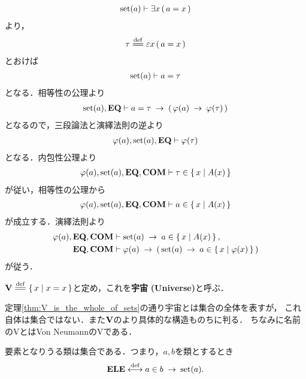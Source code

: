 	\begin{sketch}
		\begin{align}
			\operatorname*{set} (a) \vdash \exists x\, (\, a = x\, )
		\end{align}
		より，
		\begin{align}
			\tau \defeq \varepsilon x\, (\, a = x\, )
		\end{align}
		とおけば
		\begin{align}
			\operatorname*{set} (a) \vdash a = \tau
		\end{align}
		となる．相等性の公理より
		\begin{align}
			\operatorname*{set} (a),\mbox{{\bf EQ}} \vdash 
			a = \tau \hspace{0.25em}\rightarrow\hspace{0.25em} (\, \varphi(a) \hspace{0.25em}\rightarrow\hspace{0.25em} \varphi(\tau)\, )
		\end{align}
		となるので，三段論法と演繹法則の逆より
		\begin{align}
			\varphi(a),\operatorname*{set} (a),\mbox{{\bf EQ}} \vdash \varphi(\tau)
		\end{align}
		となる．内包性公理より
		\begin{align}
			\varphi(a),\operatorname*{set} (a),\mbox{{\bf EQ}},\mbox{\bf COM} \vdash \tau \in \left\{\, x \mid A(x)\, \right\}
		\end{align}
		が従い，相等性の公理から
		\begin{align}
			\varphi(a),\operatorname*{set} (a),\mbox{{\bf EQ}},\mbox{\bf COM} \vdash a \in \left\{\, x \mid A(x)\, \right\}
		\end{align}
		が成立する．演繹法則より
		\begin{align}
			\varphi(a),\mbox{{\bf EQ}},\mbox{\bf COM} &\vdash \operatorname*{set} (a) \hspace{0.25em}\rightarrow\hspace{0.25em} a \in \left\{\, x \mid A(x)\, \right\}, \\
			\mbox{{\bf EQ}},\mbox{\bf COM} &\vdash \varphi(a) \hspace{0.25em}\rightarrow\hspace{0.25em} 
			\left(\, \operatorname*{set} (a) \hspace{0.25em}\rightarrow\hspace{0.25em} a \in \left\{\, x \mid \varphi(x)\, \right\}\, \right)
		\end{align}
		が従う．
		\QED
	\end{sketch}
	
	\begin{screen}
		\begin{dfn}[宇宙]
			$\Univ \defeq \Set{x}{x=x}$と定め，これを{\bf 宇宙}
			{\bf (Universe)}と呼ぶ．
		\end{dfn}
	\end{screen}
	
	定理\ref{thm:V_is_the_whole_of_sets}の通り宇宙とは集合の全体を表すが，
	これ自体は集合ではない．また$\mathbf{V}$のより具体的な構造ものちに判る．
	ちなみに名前のVとはVon NeumannのVである．
	
	\begin{screen}
		\begin{axm}[要素の公理]
			要素となりうる類は集合である．つまり，$a,b$を類とするとき
			\begin{align}
				\mbox{{\bf ELE}} \overset{\mathrm{def}}{\longleftrightarrow} a \in b \hspace{0.25em}\rightarrow\hspace{0.25em} \operatorname*{set} (a).
			\end{align}
		\end{axm}
	\end{screen}
	
